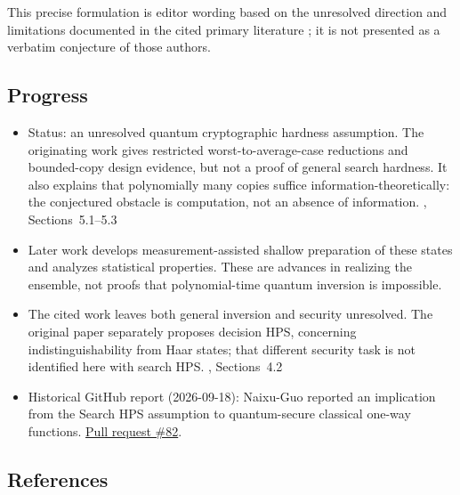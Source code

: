 This precise formulation is editor wording based on the unresolved direction and limitations documented in the cited primary literature ; it is not presented as a verbatim conjecture of those authors.

\subsection*{Progress}

\begin{itemize}
  \item Status: an unresolved quantum cryptographic hardness assumption. The originating work gives restricted worst-to-average-case reductions and bounded-copy design evidence, but not a proof of general search hardness. It also explains that polynomially many copies suffice information-theoretically: the conjectured obstacle is computation, not an absence of information. , Sections~5.1–5.3

  \item Later work develops measurement-assisted shallow preparation of these states and analyzes statistical properties. These are advances in realizing the ensemble, not proofs that polynomial-time quantum inversion is impossible. 

  \item The cited work leaves both general inversion and security unresolved. The original paper separately proposes decision HPS, concerning indistinguishability from Haar states; that different security task is not identified here with search HPS. , Sections~4.2

  \item Historical GitHub report (2026-09-18): Naixu-Guo reported an implication from the Search HPS assumption to quantum-secure classical one-way functions. \href{https://github.com/Naixu-Guo/quantum-open-problems/pull/82}{Pull request \#82}.
\end{itemize}

\subsection*{References}

